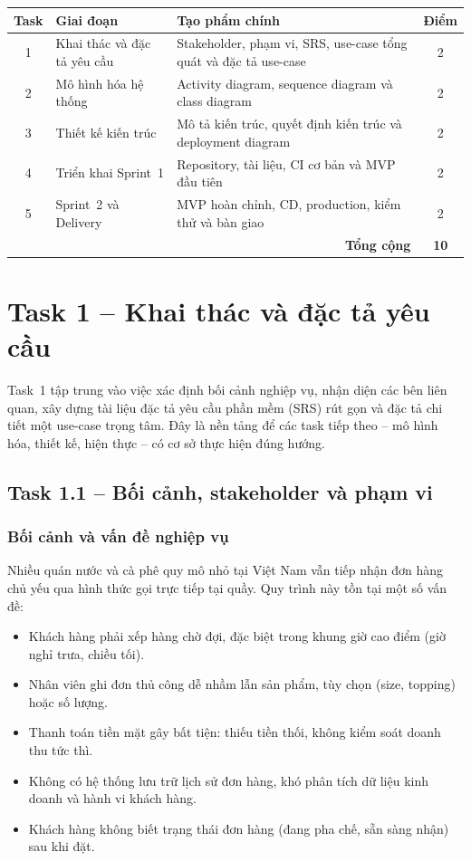 \documentclass[a4paper]{article}
\begin{document}
\begin{center}
\renewcommand{\arraystretch}{1.3}
\begin{tabular}{|c|p{4.5cm}|p{5.8cm}|c|}
\hline
\textbf{Task} & \textbf{Giai đoạn} & \textbf{Tạo phẩm chính} & \textbf{Điểm} \\ \hline
1 & Khai thác và đặc tả yêu cầu & Stakeholder, phạm vi, SRS, use-case tổng quát và đặc tả use-case & 2 \\ \hline
2 & Mô hình hóa hệ thống & Activity diagram, sequence diagram và class diagram & 2 \\ \hline
3 & Thiết kế kiến trúc & Mô tả kiến trúc, quyết định kiến trúc và deployment diagram & 2 \\ \hline
4 & Triển khai Sprint~1 & Repository, tài liệu, CI cơ bản và MVP đầu tiên & 2 \\ \hline
5 & Sprint~2 và Delivery & MVP hoàn chỉnh, CD, production, kiểm thử và bàn giao & 2 \\ \hline
\multicolumn{3}{|r|}{\textbf{Tổng cộng}} & \textbf{10} \\ \hline
\end{tabular}
\end{center}

\section{Task 1 – Khai thác và đặc tả yêu cầu}

Task~1 tập trung vào việc xác định bối cảnh nghiệp vụ, nhận diện các bên liên quan, xây dựng tài liệu đặc tả yêu cầu phần mềm (SRS) rút gọn và đặc tả chi tiết một use-case trọng tâm. Đây là nền tảng để các task tiếp theo -- mô hình hóa, thiết kế, hiện thực -- có cơ sở thực hiện đúng hướng.

\subsection{Task 1.1 – Bối cảnh, stakeholder và phạm vi}

\subsubsection{Bối cảnh và vấn đề nghiệp vụ}

Nhiều quán nước và cà phê quy mô nhỏ tại Việt Nam vẫn tiếp nhận đơn hàng chủ yếu qua hình thức gọi trực tiếp tại quầy. Quy trình này tồn tại một số vấn đề:

\begin{itemize}
    \item Khách hàng phải xếp hàng chờ đợi, đặc biệt trong khung giờ cao điểm (giờ nghỉ trưa, chiều tối).
    \item Nhân viên ghi đơn thủ công dễ nhầm lẫn sản phẩm, tùy chọn (size, topping) hoặc số lượng.
    \item Thanh toán tiền mặt gây bất tiện: thiếu tiền thối, không kiểm soát doanh thu tức thì.
    \item Không có hệ thống lưu trữ lịch sử đơn hàng, khó phân tích dữ liệu kinh doanh và hành vi khách hàng.
    \item Khách hàng không biết trạng thái đơn hàng (đang pha chế, sẵn sàng nhận) sau khi đặt.
\end{itemize}
\end{document}
